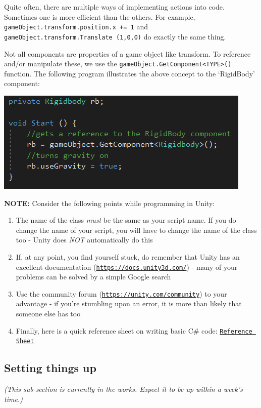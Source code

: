 \documentclass{article}[a4paper,12pt]
\theoremstyle{definition}
\begin{document}
Quite often, there are multiple ways of implementing actions into code. Sometimes one is more efficient than the others. For example, \texttt{gameObject.transform.position.x += 1} and \texttt{gameObject.transform.Translate (1,0,0)} do exactly the same thing.
\vspace{6pt}

Not all components are properties of a game object like transform. To reference and/or manipulate these, we use the \texttt{gameObject.GetComponent<TYPE>()}
function. The following program illustrates the above concept to the `RigidBody' component:
\begin{center}\includegraphics{reference_components.png}\end{center}
\textbf{NOTE:} Consider the following points while programming in Unity:
\begin{enumerate}
	\item The name of the class \textit{must} be the same as your script name. If you do change the name of your script, you will have to change the name of the class too - Unity does \textit{NOT} automatically do this
	\item If, at any point, you find yourself stuck, do remember that Unity has an excellent documentation (\texttt{\href{https://docs.unity3d.com/}{https://docs.unity3d.com/}}) - many of your problems can be solved by a simple Google search
	\item Use the community forum (\texttt{\href{https://unity.com/community}{https://unity.com/community}}) to your advantage - if you're stumbling upon an error, it is more than likely that someone else has too
	\item Finally, here is a quick reference sheet on writing basic C\# code: \texttt{\href{https://omprabhu31.github.io/gamedev/notes/gamedev_intro/scripting_reference_sheet.pdf}{Reference Sheet}}
\end{enumerate}
\subsection{Setting things up}
\textit{(This sub-section is currently in the works. Expect it to be up within a week's time.)}

\hrulefill

\end{document}
